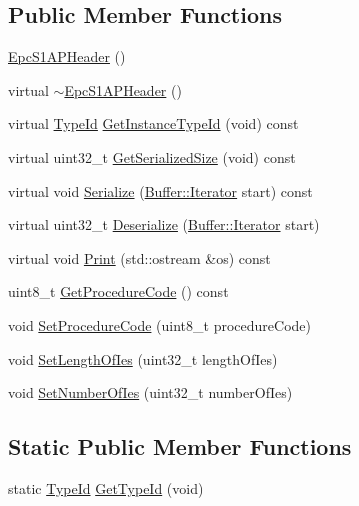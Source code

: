 \subsection*{Public Member Functions}
\begin{DoxyCompactItemize}
\item 
\hyperlink{classns3_1_1EpcS1APHeader_a1752a87c2458c33d3fa11d4e8aaa0e08}{Epc\+S1\+A\+P\+Header} ()
\item 
virtual \hyperlink{classns3_1_1EpcS1APHeader_a0f72749bc2f02f60c0e9ad01bf57a49b}{$\sim$\+Epc\+S1\+A\+P\+Header} ()
\item 
virtual \hyperlink{classns3_1_1TypeId}{Type\+Id} \hyperlink{classns3_1_1EpcS1APHeader_a719e91055a60071b494c08aa0b94f5b6}{Get\+Instance\+Type\+Id} (void) const 
\item 
virtual uint32\+\_\+t \hyperlink{classns3_1_1EpcS1APHeader_a17cde6b89e77b7854b899032b426089d}{Get\+Serialized\+Size} (void) const 
\item 
virtual void \hyperlink{classns3_1_1EpcS1APHeader_a893a72f6574f282a96ed0f6dfbbab8cb}{Serialize} (\hyperlink{classns3_1_1Buffer_1_1Iterator}{Buffer\+::\+Iterator} start) const 
\item 
virtual uint32\+\_\+t \hyperlink{classns3_1_1EpcS1APHeader_a744f250feb1d75cf58ec04c2ca8d32f9}{Deserialize} (\hyperlink{classns3_1_1Buffer_1_1Iterator}{Buffer\+::\+Iterator} start)
\item 
virtual void \hyperlink{classns3_1_1EpcS1APHeader_a6593e00e94e4e66238b94966ce80ce7d}{Print} (std\+::ostream \&os) const 
\item 
uint8\+\_\+t \hyperlink{classns3_1_1EpcS1APHeader_ad1e941a95dc41b279eaf99ecaedaae6b}{Get\+Procedure\+Code} () const 
\item 
void \hyperlink{classns3_1_1EpcS1APHeader_a4cdf54efa3a6af2ea6b03b8143115101}{Set\+Procedure\+Code} (uint8\+\_\+t procedure\+Code)
\item 
void \hyperlink{classns3_1_1EpcS1APHeader_a09b39a9610839cadc14c24674eb5b6df}{Set\+Length\+Of\+Ies} (uint32\+\_\+t length\+Of\+Ies)
\item 
void \hyperlink{classns3_1_1EpcS1APHeader_ae08ef9186cca3bd2ec641e558b4781f8}{Set\+Number\+Of\+Ies} (uint32\+\_\+t number\+Of\+Ies)
\end{DoxyCompactItemize}
\subsection*{Static Public Member Functions}
\begin{DoxyCompactItemize}
\item 
static \hyperlink{classns3_1_1TypeId}{Type\+Id} \hyperlink{classns3_1_1EpcS1APHeader_aa821ec79fe4738187ca76c784eff4278}{Get\+Type\+Id} (void)
\end{DoxyCompactItemize}
